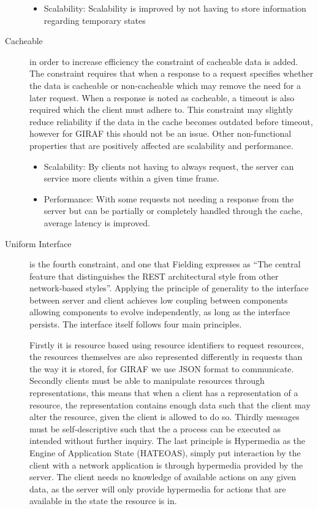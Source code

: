 \begin{description}
\begin{itemize}
        \item Scalability: Scalability is improved by not having to store information regarding temporary states
    \end{itemize}
    \item [Cacheable] in order to increase efficiency the constraint of cacheable data is added.
    The constraint requires that when a response to a request specifies whether the data is cacheable or non-cacheable which may remove the need for a later request.
    When a response is noted as cacheable, a timeout is also required which the client must adhere to.
    This constraint may slightly reduce reliability if the data in the cache becomes outdated before timeout, however for GIRAF this should not be an issue.
    Other non-functional properties that are positively affected are scalability and performance.
    \begin{itemize}
        \item Scalability: By clients not having to always request, the server can service more clients within a given time frame.
        \item Performance: With some requests not needing a response from the server but can be partially or completely handled through the cache, average latency is improved.
    \end{itemize}
    \item [Uniform Interface] is the fourth constraint, and one that Fielding expresses as \enquote{The central feature that distinguishes the REST architectural style from other network-based styles}\citep{fielding2000rest}.
    Applying the principle of generality to the interface between server and client achieves low coupling between components allowing components to evolve independently, as long as the interface persists. 
    The interface itself follows four main principles.

    Firstly it is resource based using resource identifiers to request resources, the resources themselves are also represented differently in requests than the way it is stored, for GIRAF we use JSON format to communicate.
    Secondly clients must be able to manipulate resources through representations, this means that when a client has a representation of a resource, the representation contains enough data such that the client may alter the resource, given the client is allowed to do so.
    Thirdly messages must be self-descriptive such that the a process can be executed as intended without further inquiry.
    The last principle is Hypermedia as the Engine of Application State (HATEOAS), simply put interaction by the client with a network application is through hypermedia provided by the server.
    The client needs no knowledge of available actions on any given data, as the server will only provide hypermedia for actions that are available in the state the resource is in.


\end{description}
